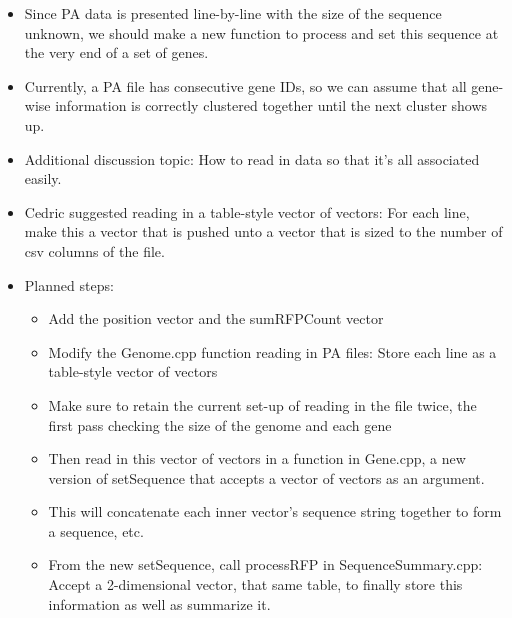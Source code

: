 \documentclass[12pt,hyperref]{labbook}
\begin{document}
\begin{itemize}
\begin{itemize}
        \item Since PA data is presented line-by-line with the size of the sequence unknown, we should make a new function to process and set this sequence at the very end of a set of genes.
        \item Currently, a PA file has consecutive gene IDs, so we can assume that all gene-wise information is correctly clustered together until the next cluster shows up.
        \item Additional discussion topic: How to read in data so that it's all associated easily.
        \item Cedric suggested reading in a table-style vector of vectors: For each line, make this a vector that is pushed unto a vector that is sized to the number of csv columns of the file.
        \item Planned steps:
        \begin{itemize}
            \item Add the position vector and the sumRFPCount vector
            \item Modify the Genome.cpp function reading in PA files: Store each line as a table-style vector of vectors
            \item Make sure to retain the current set-up of reading in the file twice, the first pass checking the size of the genome and each gene
            \item Then read in this vector of vectors in a function in Gene.cpp, a new version of setSequence that accepts a vector of vectors as an argument.
            \item This will concatenate each inner vector's sequence string together to form a sequence, etc.
            \item From the new setSequence, call processRFP in SequenceSummary.cpp: Accept a 2-dimensional vector, that same table, to finally store this information as well as summarize it.
        \end{itemize}
    \end{itemize}
\end{itemize}

\end{document}
